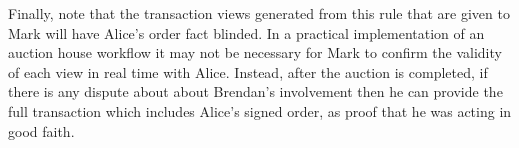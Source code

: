 Finally, note that the transaction views generated from this rule that are given to Mark will have Alice's order fact blinded. In a practical implementation of an auction house workflow it may not be necessary for Mark to confirm the validity of each view in real time with Alice. Instead, after the auction is completed, if there is any dispute about about Brendan's involvement then he can provide the full transaction which includes Alice's signed order, as proof that he was acting in good faith.



